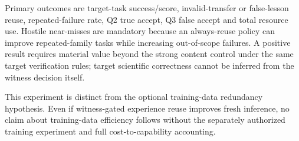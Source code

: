 Primary outcomes are target-task success/score, invalid-transfer or false-lesson reuse, repeated-failure rate, Q2 true accept, Q3 false accept and total resource use. Hostile near-misses are mandatory because an always-reuse policy can improve repeated-family tasks while increasing out-of-scope failures. A positive result requires material value beyond the strong content control under the same target verification rules; target scientific correctness cannot be inferred from the witness decision itself.

This experiment is distinct from the optional training-data redundancy hypothesis. Even if witness-gated experience reuse improves fresh inference, no claim about training-data efficiency follows without the separately authorized training experiment and full cost-to-capability accounting.
